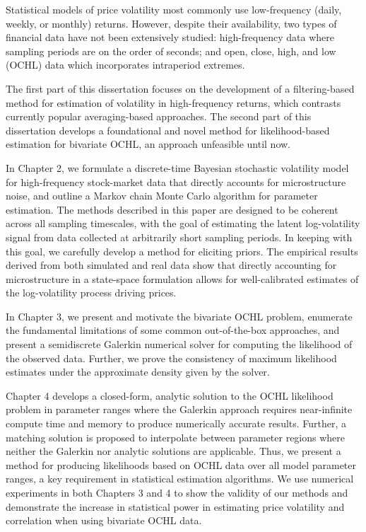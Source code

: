 Statistical models of price volatility most commonly use low-frequency
(daily, weekly, or monthly) returns. However, despite their
availability, two types of financial data have not been extensively
studied: high-frequency data where sampling periods are on the order
of seconds; and open, close, high, and low (OCHL) data which
incorporates intraperiod extremes.

The first part of this dissertation focuses on the development of a
filtering-based method for estimation of volatility in high-frequency
returns, which contrasts currently popular averaging-based
approaches. The second part of this dissertation develops a
foundational and novel method for likelihood-based estimation for
bivariate OCHL, an approach unfeasible until now.

In Chapter 2, we formulate a discrete-time Bayesian stochastic
volatility model for high-frequency stock-market data that directly
accounts for microstructure noise, and outline a Markov chain Monte
Carlo algorithm for parameter estimation. The methods described in
this paper are designed to be coherent across all sampling timescales,
with the goal of estimating the latent log-volatility signal from data
collected at arbitrarily short sampling periods. In keeping with this
goal, we carefully develop a method for eliciting priors. The
empirical results derived from both simulated and real data show that
directly accounting for microstructure in a state-space formulation
allows for well-calibrated estimates of the log-volatility process
driving prices.

In Chapter 3, we present and motivate the bivariate OCHL problem,
enumerate the fundamental limitations of some common out-of-the-box
approaches, and present a semidiscrete Galerkin numerical solver for
computing the likelihood of the observed data. Further, we prove the
consistency of maximum likelihood estimates under the approximate
density given by the solver.

Chapter 4 develops a closed-form, analytic solution to the OCHL
likelihood problem in parameter ranges where the Galerkin approach
requires near-infinite compute time and memory to produce numerically
accurate results. Further, a matching solution is proposed to
interpolate between parameter regions where neither the Galerkin nor
analytic solutions are applicable. Thus, we present a method for
producing likelihoods based on OCHL data over all model parameter
ranges, a key requirement in statistical estimation algorithms. We use
numerical experiments in both Chapters 3 and 4 to show the validity of
our methods and demonstrate the increase in statistical power in
estimating price volatility and correlation when using bivariate OCHL
data.